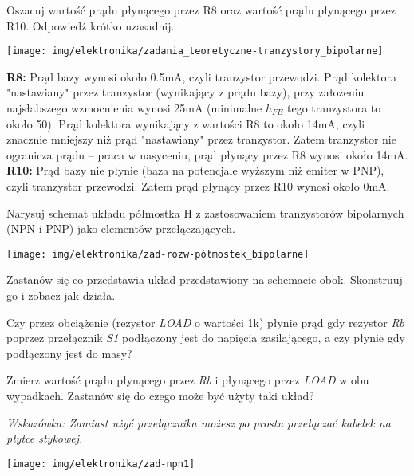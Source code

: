 \dbEntryCheckResults
Oszacuj wartość prądu płynącego przez R8 oraz wartość prądu płynącego przez R10. Odpowiedź krótko uzasadnij.
	\vspace{-6.5mm}\begin{center} \texttt{[image: img/elektronika/zadania\_teoretyczne-tranzystory\_bipolarne]} \end{center}
\fi
{}\dbEntryCheckResults
\textbf{R8:} Prąd bazy wynosi około 0.5mA, czyli tranzystor przewodzi.
             Prąd kolektora "nastawiany" przez tranzystor (wynikający z prądu bazy), przy założeniu najsłabszego wzmocnienia wynosi 25mA (minimalne $h_{FE}$ tego tranzystora to około 50).
             Prąd kolektora wynikający z wartości R8 to około 14mA, czyli znacznie mniejszy niż prąd "nastawiany" przez tranzystor.
             Zatem tranzystor nie ogranicza prądu – praca w nasyceniu, prąd płynący przez R8 wynosi około 14mA.\\
\textbf{R10:} Prąd bazy nie płynie (baza na potencjale wyższym niż emiter w PNP), czyli tranzystor przewodzi.
              Zatem prąd płynący przez R10 wynosi około 0mA.
\fi

\dbEntryCheckResults
Narysuj schemat układu półmostka H z zastosowaniem tranzystorów bipolarnych (NPN i PNP) jako elementów przełączających.
\fi
{}\dbEntryCheckResults
\begin{center}\texttt{[image: img/elektronika/zad-rozw-półmostek\_bipolarne]}\end{center}
\fi


%
%

\dbEntryCheckResults
\noindent\begin{minipage}[b]{0.6\textwidth}
Zastanów się co przedstawia układ przedstawiony na schemacie obok. Skonstruuj go i zobacz jak działa.

Czy przez obciążenie (rezystor \textit{LOAD} o wartości 1k) płynie prąd gdy rezystor \textit{Rb} poprzez przełącznik \textit{S1} podłączony jest do napięcia zasilającego, a czy płynie gdy podłączony jest do masy?

Zmierz wartość prądu płynącego przez \textit{Rb} i płynącego przez \textit{LOAD} w obu wypadkach. Zastanów się do czego może być użyty taki układ?

\textit{Wskazówka: Zamiast użyć przełącznika możesz po prostu przełączać kabelek na płytce stykowej.}
\end{minipage}
\hfill
\begin{minipage}[b]{0.35\textwidth}
\texttt{[image: img/elektronika/zad-npn1]}
\end{minipage}
\fi


